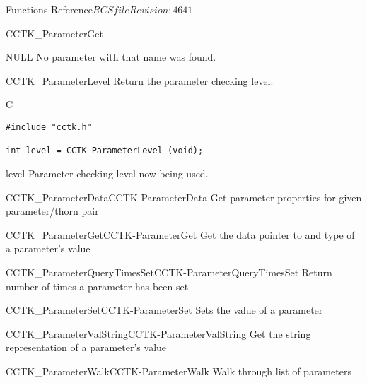 \begin{cactuspart}{ Functions Reference}{$RCSfile$}{$Revision: 4641 $}
\begin{FunctionDescription}{CCTK\_ParameterGet}
\begin{ErrorSection}
\begin{Error}{NULL}
No parameter with that name was found.
\end{Error}
\end{ErrorSection}
\end{FunctionDescription}


\begin{FunctionDescription}{CCTK\_ParameterLevel}
\label{CCTK-ParameterLevel}
Return the parameter checking level.

\begin{SynopsisSection}
\begin{Synopsis}{C}
\begin{verbatim}
#include "cctk.h"

int level = CCTK_ParameterLevel (void);
\end{verbatim}
\end{Synopsis}
\end{SynopsisSection}

\begin{ResultSection}
\begin{Result}{level}
Parameter checking level now being used.
\end{Result}
\end{ResultSection}

\begin{SeeAlsoSection}
\begin{SeeAlso2}{CCTK\_ParameterData}{CCTK-ParameterData}
  Get parameter properties for given parameter/thorn pair
\end{SeeAlso2}
\begin{SeeAlso2}{CCTK\_ParameterGet}{CCTK-ParameterGet}
  Get the data pointer to and type of a parameter's value
\end{SeeAlso2}
\begin{SeeAlso2}{CCTK\_ParameterQueryTimesSet}{CCTK-ParameterQueryTimesSet}
  Return number of times a parameter has been set
\end{SeeAlso2}
\begin{SeeAlso2}{CCTK\_ParameterSet}{CCTK-ParameterSet}
  Sets the value of a parameter
\end{SeeAlso2}
\begin{SeeAlso2}{CCTK\_ParameterValString}{CCTK-ParameterValString}
  Get the string representation of a parameter's value
\end{SeeAlso2}
\begin{SeeAlso2}{CCTK\_ParameterWalk}{CCTK-ParameterWalk}
  Walk through list of parameters
\end{SeeAlso2}
\end{SeeAlsoSection}
\end{FunctionDescription}



\end{cactuspart}
